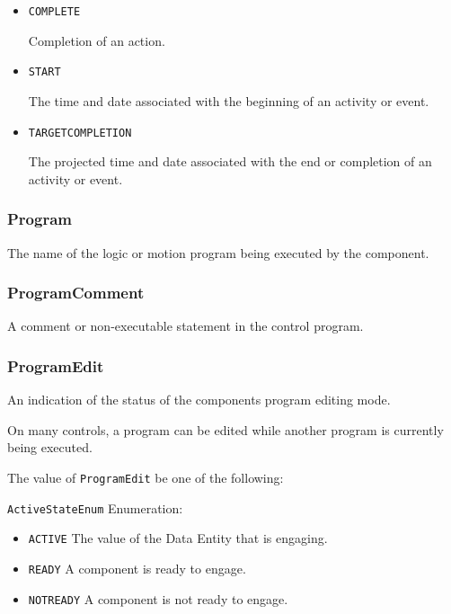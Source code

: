 \begin{itemize}

\item \texttt{COMPLETE}


Completion of an action.

\item \texttt{START}


The time and date associated with the beginning of an activity or event.

\item \texttt{TARGET\textunderscore COMPLETION}


The projected time and date associated with the end or completion of an activity or event.


\end{itemize}






\subsubsection{Program}
\label{sec:Program}



The name of the logic or motion program being executed by the  component.



\subsubsection{ProgramComment}
\label{sec:ProgramComment}



A comment or non-executable statement in the control program.



\subsubsection{ProgramEdit}
\label{sec:ProgramEdit}



An indication of the status of the  components program editing mode. 

On many controls, a program can be edited while another program is currently being executed.


The value of \texttt{ProgramEdit} \MUST be one of the following: 


\texttt{ActiveStateEnum} Enumeration:

\begin{itemize}
\item \texttt{ACTIVE} \newline The value of the \gls{Data Entity} that is engaging. 
\item \texttt{READY} \newline A component is ready to engage. 
\item \texttt{NOT\textunderscore READY} \newline A component is not ready to engage. 
\end{itemize}



